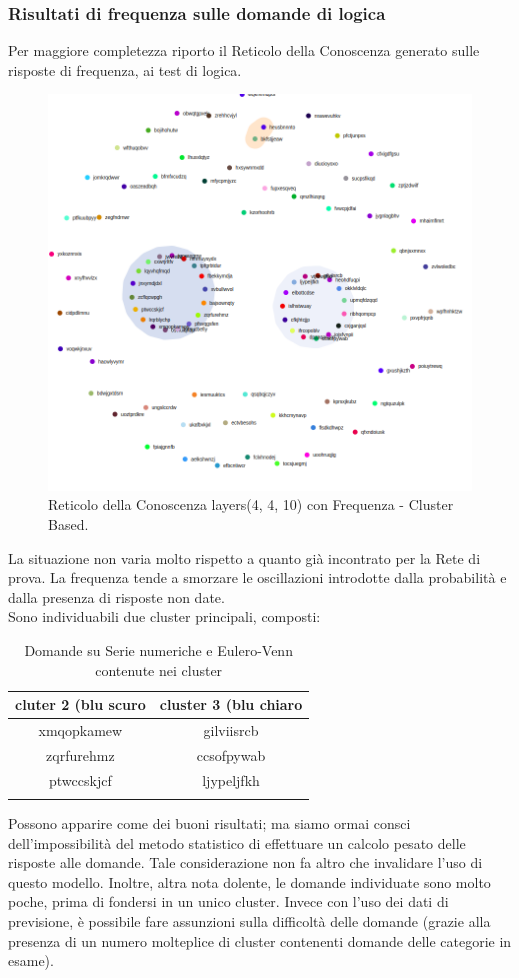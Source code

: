 \subsubsection{Risultati di frequenza sulle domande di logica}
\label{Risultati di frequenza sulle domande di logica}
Per maggiore completezza riporto il Reticolo della Conoscenza generato sulle risposte di frequenza, ai test di logica.
\begin{figure}[H]
\centering
	\includegraphics[width=0.70\linewidth]{./image/frequence-logica(4,4,10).png}
	\caption{Reticolo della Conoscenza layers(4, 4, 10) con Frequenza - Cluster Based.}
	\label{Reticolo della Conoscenza layers(4, 4, 10) con Frequenza - Cluster Based.}
\end{figure}
\noindent
La situazione non varia molto rispetto a quanto già incontrato per la Rete di prova. La frequenza tende a smorzare le oscillazioni introdotte dalla probabilità e dalla presenza di risposte non date.\\
Sono individuabili due cluster principali, composti:
\begin{longtable}{|c|c|}
	\hline
	\textbf{cluter 2 (blu scuro} & \textbf{cluster 3 (blu chiaro} \\\hline\hline
	xmqopkamew & gilviisrcb \\
	zqrfurehmz & ccsofpywab \\
	ptwccskjcf & ljypeljfkh \\
\hline
\caption{Domande su Serie numeriche e Eulero-Venn contenute nei cluster}\label{tab:domande su serie e eulero-venn contenute nei cluste)}
\end{longtable}
\noindent
Possono apparire come dei buoni risultati; ma siamo ormai consci dell'impossibilità del metodo statistico di effettuare un calcolo pesato delle risposte alle domande. Tale considerazione non fa altro che invalidare l'uso di questo modello.
\noindent
Inoltre, altra nota dolente, le domande individuate sono molto poche, prima di fondersi in un unico cluster. Invece con l'uso dei dati di previsione, è possibile fare assunzioni sulla difficoltà delle domande (grazie alla presenza di un numero molteplice di cluster contenenti domande delle categorie in esame).


